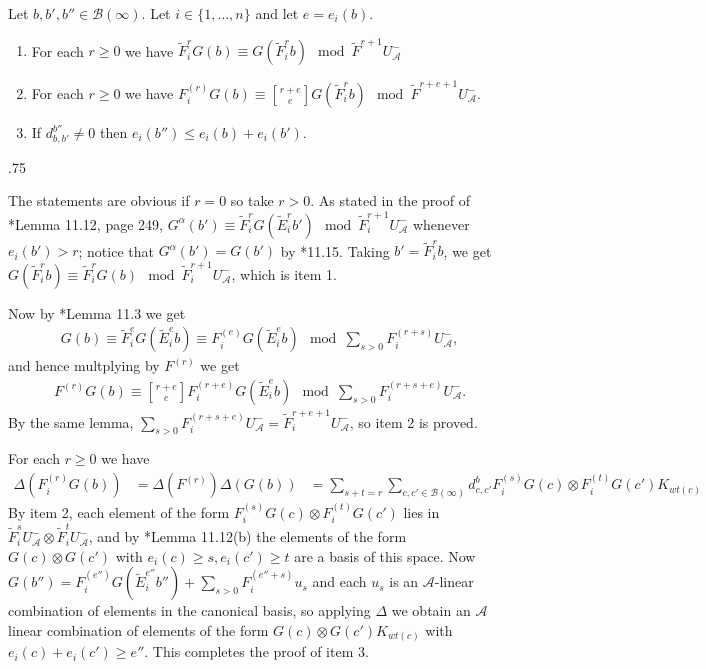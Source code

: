 \documentclass[11pt,fleqn]{article}
\makeatletter
\renewenvironment{proof}[1][\textit{Proof}]{\par
  \pushQED{\qed}%
  \normalfont \topsep.75\paraskip\relax
  \trivlist
  \item[\hskip\labelsep
        \itshape
    #1\@addpunct{.}]\ignorespaces
}{%
  \popQED\endtrivlist\@endpefalse
}
\newcommand\ot{\otimes}
\newcommand\qbinom[2]{\genfrac{[}{]}{0pt}{0}{#1}{#2}}
\newcommand\A{\mathcal A}
\newcommand\B{\mathcal B}
\makeatother
\begin{document}
\begin{Lemma}
Let $b,b',b'' \in \B(\infty)$. Let $i \in \{1, \ldots, n\}$ and let 
$e = e_i(b)$.
\begin{enumerate}
\item For each $r \geq 0$ we have $\tilde F_i^r G(b) \equiv G(\tilde F_i^r b)
\mod \tilde F^{r+1} U_\A^-$  

\item For each $r \geq 0$ we have $F_i^{(r)} G(b) \equiv \qbinom{r+e}{e} 
G(\tilde F_i^r b) \mod \tilde F^{r+e+1} U_\A^-$.

\item If $d_{b,b'}^{b''} \neq 0$ then $e_i(b'') \leq e_i(b) + e_i(b')$.
\end{enumerate}
\end{Lemma}
\begin{proof}
The statements are obvious if $r = 0$ so take $r > 0$.
As stated in the proof of \cite{Jan}*{Lemma 11.12}, page 249, $G^\alpha(b') 
\equiv \tilde F_i^r  G(\tilde E_i^r b') \mod \tilde F_i^{r+1} U^-_\A$ whenever
$e_i(b') > r$; notice that $G^\alpha(b') = G(b')$ by \cite{Jan}*{11.15}. 
Taking $b' = \tilde F_i^r b$, we get $G(\tilde F_i^r b) \equiv \tilde F_i^r 
G(b) \mod \tilde F_i^{r+1}U_\A^-$, which is item 1. 

Now by \cite{Jan}*{Lemma 11.3} we get
\begin{align*}
G(b) 
  \equiv \tilde F_i^e G(\tilde E_i^e b) 
  \equiv F_i^{(e)} G(\tilde E_i^e b) 
  \mod \sum_{s > 0} F_i^{(r+s)} U_\A^-,
\end{align*}
and hence multplying by $F^{(r)}$ we get
\begin{align*}
F^{(r)} G(b) 
  \equiv \qbinom{r+e}{e} F_i^{(r+e)} G(\tilde E_i^e b) 
  \mod \sum_{s > 0} F_i^{(r+s+e)} U_\A^-.
\end{align*}
By the same lemma, $\sum_{s > 0} F_i^{(r+s+e)} U_\A^- = \tilde F_i^{r+e+1} 
U_\A^-$, so item 2 is proved. 

For each $r \geq 0$ we have
\begin{align*}
\Delta(F_i^{(r)}G(b))
  &= \Delta(F^{(r)}) \Delta(G(b))
  &= \sum_{s+t = r} \sum_{c,c' \in \B(\infty)} 
    d_{c,c'}^b F_i^{(s)} G(c) \ot F_i^{(t)} G(c') K_{wt(c)}
\end{align*}
By item 2, each element of the form $F_i^{(s)} G(c) \ot F_i^{(t)} G(c')$
lies in $\tilde F_i^s U_\A^- \ot \tilde F_i^t U_\A^-$, and by 
\cite{Jan}*{Lemma 11.12(b)} the elements of the form $G(c) \ot G(c')$ with 
$e_i(c) \geq s, e_i(c') \geq t$ are a basis of this space. Now $G(b'') = 
F_i^{(e'')} G(\tilde E_i^{e''} b'') + \sum_{s>0} F_i^{(e''+s)} u_s$ and each 
$u_s$ is an $\A$-linear combination of elements in the canonical basis, so 
applying $\Delta$ we obtain an $\A$ linear combination of elements of the form 
$G(c)\ot G(c')K_{wt(c)}$ with $e_i(c) + e_i(c') \geq e''$. This completes the 
proof of item 3.
\end{proof}
\end{document}
